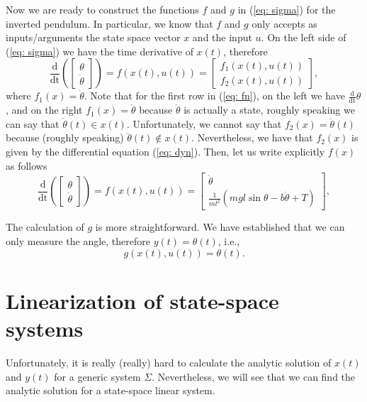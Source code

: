 \documentclass[11pt,a4paper,titlepage]{article}
\begin{document}
Now we are ready to construct the functions $f$ and $g$ in (\ref{eq: sigma}) for the inverted pendulum. In particular, we know that $f$ and $g$ only accepts as inputs/arguments the state space vector $x$ and the input $u$. On the left side of (\ref{eq: sigma}) we have the time derivative of $x(t)$, therefore
\begin{equation}
	\frac{\mathrm{d}}{\mathrm{dt}}\left(\begin{bmatrix}\theta \\ \dot\theta \end{bmatrix}\right) = f(x(t), u(t)) = \begin{bmatrix}f_1(x(t), u(t)) \\ f_2(x(t), u(t))\end{bmatrix}, \label{eq: fn}
\end{equation}
where $f_1(x) = \dot\theta$. Note that for the first row in (\ref{eq: fn}), on the left we have $\frac{\mathrm{d}}{\mathrm{dt}}\theta$, and on the right $f_1(x) = \dot\theta$ because $\dot\theta$ is actually a state, roughly speaking we can say that $\dot\theta(t) \in x(t)$. Unfortunately, we cannot say that $f_2(x) = \ddot\theta(t)$ because (roughly speaking) $\ddot\theta(t) \notin x(t)$. Nevertheless, we have that $f_2(x)$ is given by the differential equation (\ref{eq: dyn}). Then, let us write explicitly $f(x)$ as follows
\begin{equation}
	\frac{\mathrm{d}}{\mathrm{dt}}\left(\begin{bmatrix}\theta \\ \dot\theta \end{bmatrix}\right) =  f(x(t), u(t)) = \begin{bmatrix} \dot\theta \\ \frac{1}{ml^2}\left(mgl\sin{\theta}-b\dot\theta + T\right) \end{bmatrix}, \label{eq: f}
\end{equation}

The calculation of $g$ is more straightforward. We have established that we can only measure the angle, therefore $y(t) = \theta(t)$, i.e.,
\begin{equation}
g(x(t),u(t)) =  \theta(t).
	\label{eq: g}
\end{equation}


\section{Linearization of state-space systems}
Unfortunately, it is really (really) hard to calculate the analytic solution of $x(t)$ and $y(t)$ for a generic system $\Sigma$. Nevertheless, we will see that we can find the analytic solution for a state-space linear system.
\end{document}
